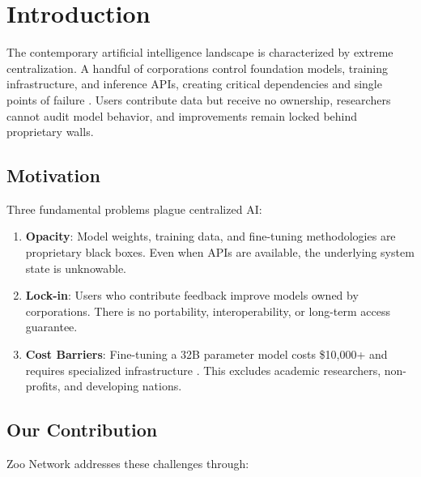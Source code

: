\section{Introduction}


The contemporary artificial intelligence landscape is characterized by extreme centralization. A handful of corporations control foundation models, training infrastructure, and inference APIs, creating critical dependencies and single points of failure \cite{bender2021dangers}. Users contribute data but receive no ownership, researchers cannot audit model behavior, and improvements remain locked behind proprietary walls.

\subsection{Motivation}

Three fundamental problems plague centralized AI:

\begin{enumerate}[leftmargin=*]
\item \textbf{Opacity}: Model weights, training data, and fine-tuning methodologies are proprietary black boxes. Even when APIs are available, the underlying system state is unknowable.
\item \textbf{Lock-in}: Users who contribute feedback improve models owned by corporations. There is no portability, interoperability, or long-term access guarantee.
\item \textbf{Cost Barriers}: Fine-tuning a 32B parameter model costs \$10,000+ and requires specialized infrastructure \cite{tencent2025grpo}. This excludes academic researchers, non-profits, and developing nations.
\end{enumerate}

\subsection{Our Contribution}

Zoo Network addresses these challenges through:

